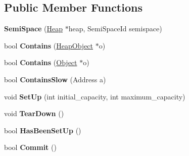 \subsection*{Public Member Functions}
\begin{DoxyCompactItemize}
\item 
{\bfseries Semi\+Space} (\hyperlink{classv8_1_1internal_1_1_heap}{Heap} $\ast$heap, Semi\+Space\+Id semispace)\hypertarget{classv8_1_1internal_1_1_semi_space_a1958ffe221d002476c29da54612956f0}{}\label{classv8_1_1internal_1_1_semi_space_a1958ffe221d002476c29da54612956f0}

\item 
bool {\bfseries Contains} (\hyperlink{classv8_1_1internal_1_1_heap_object}{Heap\+Object} $\ast$o)\hypertarget{classv8_1_1internal_1_1_semi_space_a7b8cab12d3c9941c5d09b181900dd61c}{}\label{classv8_1_1internal_1_1_semi_space_a7b8cab12d3c9941c5d09b181900dd61c}

\item 
bool {\bfseries Contains} (\hyperlink{classv8_1_1internal_1_1_object}{Object} $\ast$o)\hypertarget{classv8_1_1internal_1_1_semi_space_a6dc2672844ad19e9ed67d92fd8fa7d52}{}\label{classv8_1_1internal_1_1_semi_space_a6dc2672844ad19e9ed67d92fd8fa7d52}

\item 
bool {\bfseries Contains\+Slow} (Address a)\hypertarget{classv8_1_1internal_1_1_semi_space_abbbef2d1954093488b830f774c5bfb76}{}\label{classv8_1_1internal_1_1_semi_space_abbbef2d1954093488b830f774c5bfb76}

\item 
void {\bfseries Set\+Up} (int initial\+\_\+capacity, int maximum\+\_\+capacity)\hypertarget{classv8_1_1internal_1_1_semi_space_aefc6e25c67c69b849e7771d55bd999c5}{}\label{classv8_1_1internal_1_1_semi_space_aefc6e25c67c69b849e7771d55bd999c5}

\item 
void {\bfseries Tear\+Down} ()\hypertarget{classv8_1_1internal_1_1_semi_space_a2e5b66ad47c14767b0035ed5006c2152}{}\label{classv8_1_1internal_1_1_semi_space_a2e5b66ad47c14767b0035ed5006c2152}

\item 
bool {\bfseries Has\+Been\+Set\+Up} ()\hypertarget{classv8_1_1internal_1_1_semi_space_ae549c9fcda92bd48717df21eb7ffe024}{}\label{classv8_1_1internal_1_1_semi_space_ae549c9fcda92bd48717df21eb7ffe024}

\item 
bool {\bfseries Commit} ()\hypertarget{classv8_1_1internal_1_1_semi_space_abcde77679b352a13023036322527bdd8}{}\label{classv8_1_1internal_1_1_semi_space_abcde77679b352a13023036322527bdd8}


\end{DoxyCompactItemize}
